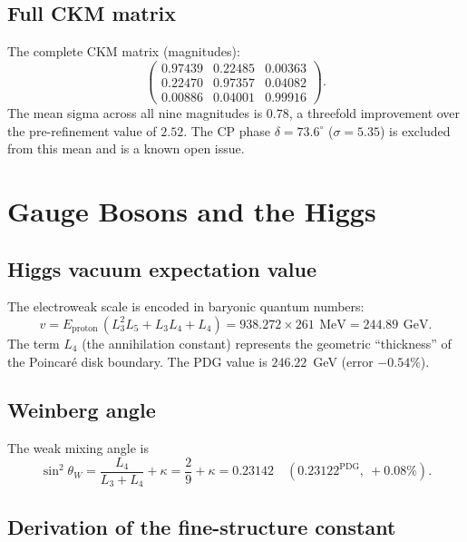 \documentclass[aps,prd,reprint,twocolumn,showpacs,superscriptaddress]{revtex4-2}
\newcommand{\mev}{\,\text{MeV}}
\newcommand{\gev}{\,\text{GeV}}
\newcommand{\PDG}[1]{\ensuremath{#1^{\text{PDG}}}}
\begin{document}
\subsection{Full CKM matrix}

The complete CKM matrix (magnitudes):
\[
\begin{pmatrix}
0.97439 & 0.22485 & 0.00363 \\
0.22470 & 0.97357 & 0.04082 \\
0.00886 & 0.04001 & 0.99916
\end{pmatrix}.
\]
The mean sigma across all nine magnitudes is $0.78$, a
threefold improvement over the pre-refinement value of $2.52$.
The CP phase $\delta = 73.6^\circ$ ($\sigma = 5.35$) is excluded
from this mean and is a known open issue.

\section{Gauge Bosons and the Higgs}
\label{sec:gauge}

\subsection{Higgs vacuum expectation value}

The electroweak scale is encoded in baryonic quantum numbers:
\begin{equation}
v = E_{\text{proton}}\,(L_3^2 L_5 + L_3 L_4 + L_4)
  = 938.272 \times 261\ \mev
  = 244.89\ \gev.
\end{equation}
The term $L_4$ (the annihilation constant) represents the geometric
``thickness'' of the Poincar\'{e} disk boundary.  The PDG value is
$246.22$~GeV (error $-0.54\%$).

\subsection{Weinberg angle}

The weak mixing angle is
\begin{equation}
\sin^2\theta_W = \frac{L_4}{L_3 + L_4} + \kappa
               = \frac{2}{9} + \kappa
               = 0.23142
               \quad (\PDG{0.23122},\ +0.08\%).
\end{equation}

\subsection{Derivation of the fine-structure constant}
\end{document}
